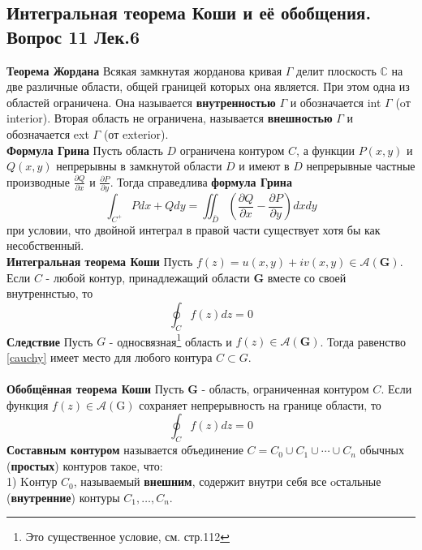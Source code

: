 \documentclass{article}
\begin{document}
\subsection{Интегральная теорема Коши и её обобщения. Вопрос 11 Лек.6}
	\textbf{Теорема Жордана} Всякая замкнутая жорданова кривая $\Gamma$ делит плоскость $\mathbb{C}$ на две различные области, общей границей которых она является. При этом одна из областей ограничена. Она называется \textbf{внутренностью} $\Gamma$ и обозначается int $ \Gamma $ (oт interior). Вторая область не ограничена, называется \textbf{внешностью} $ \Gamma $ и обозначается ext $ \Gamma $ (от exterior).\\
	\textbf{Формула Грина} Пусть область $ D $ ограничена контуром $ C$, а функции $ P(x, y) $ и $ Q(x, y) $ непрерывны в замкнутой области $ D $ и имеют в $ D $ непрерывные частные производные $ \frac{\partial Q}{\partial x} $ и $ \frac{\partial P}{\partial y} $. Тогда справедлива \textbf{формула Грина}
	\begin{equation}
	\int_{C^{+}} P d x+Q d y=\iint_{\bar{D}}\left(\frac{\partial Q}{\partial x}-\frac{\partial P}{\partial y}\right) d x d y
	\end{equation}
	при условии, что двойной интеграл в правой части существует хотя бы как несобственный.\\
	\textbf{Интегральная теорема Коши} Пусть $f(z)=u(x,y)+iv(x,y)\in \mathcal{A}(\mathbf{G})$. Если $C$ - любой контур, принадлежащий области $\mathbf{G}$ вместе со своей внутреннстью, то
	\begin{equation}
	\oint_{C}f(z)dz=0
	\label{cauchy}
	\end{equation}
	\textbf{Следствие} Пусть $G$ - односвязная\footnote{Это существенное условие, см. стр.112} область и $ f(z) \in \mathcal{A}(\mathbf{G}) $. Тогда равенство \ref{cauchy} имеет место для любого контура $ C \subset  G$.\\
	\\
	\textbf{Обобщённая теорема Коши} Пусть $ \mathbf{G}$ - область, ограниченная контуром $ C $. Если функция $ f(z) \in \mathcal{A}(\mathrm{G}) $ сохраняет непрерывность на границе области, то
	\begin{equation}
	\oint_{C} f(z) d z=0
	\end{equation}
	\textbf{Составным контуром} называется объединение $ C=C_{0} \cup C_{1} \cup \cdots \cup C_{n} $ обычных (\textbf{простых}) контуров такое, что:\\
	1) Kонтур $C_{0}$, называемый \textbf{внешним}, содержит внутри себя все oстальные (\textbf{внутренние}) контуры $C_{1}, \ldots, C_{n}$.\\ 
\end{document}
